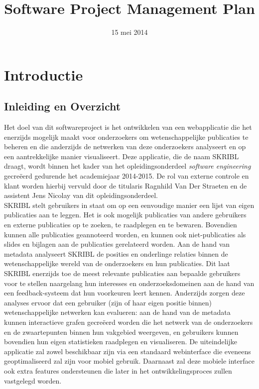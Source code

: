 \documentclass{article}
\title{Software Project Management Plan}
\author{} %
\date{15 mei 2014} %
\begin{document}




\tableofcontents
\newpage








\section{Introductie}

\subsection{Inleiding en Overzicht}
Het doel van dit softwareproject is het ontwikkelen van een webapplicatie die het enerzijds mogelijk maakt voor onderzoekers om wetenschappelijke publicaties te beheren en die anderzijds de netwerken van deze onderzoekers analyseert en op een aantrekkelijke manier visualiseert. Deze applicatie, die de naam SKRIBL draagt, wordt binnen het kader van het opleidingsonderdeel \emph{software engineering} gecre\"{e}erd gedurende het academiejaar 2014-2015. De rol van externe controle en klant worden hierbij vervuld door de titularis Ragnhild Van Der Straeten en de assistent Jens Nicolay van dit opleidingsonderdeel.\newline
\\
SKRIBL stelt gebruikers in staat om op een eenvoudige manier een lijst van eigen publicaties aan te leggen. Het is ook mogelijk publicaties van andere gebruikers en externe publicaties op te zoeken, te raadplegen en te bewaren. Bovendien kunnen alle publicaties geannoteerd worden, en kunnen ook niet-publicaties als slides en bijlagen aan de publicaties gerelateerd worden. Aan de hand van metadata analyseert SKRIBL de posities en onderlinge relaties binnen de wetenschappelijke wereld van de onderzoekers en hun publicaties. Dit laat SKRIBL enerzijds toe de meest relevante publicaties aan bepaalde gebruikers voor te stellen naargelang hun interesses en onderzoeksdomeinen aan de hand van een feedback-systeem dat hun voorkeuren leert kennen. Anderzijds zorgen deze analyses ervoor dat een gebruiker (zijn of haar eigen positie binnen) wetenschappelijke netwerken kan evalueren: aan de hand van de metadata kunnen interactieve grafen gecre\"{e}erd worden die het netwerk van de onderzoekers en de zwaartepunten binnen hun vakgebied weergeven, en gebruikers kunnen bovendien hun eigen statistieken raadplegen en visualiseren. De uiteindelijke applicatie zal zowel beschikbaar zijn via een standaard webinterface die eveneens geoptimaliseerd zal zijn voor mobiel gebruik. Daarnaast zal deze mobiele interface ook extra features ondersteunen die later in het ontwikkelingsproces zullen vastgelegd worden.\newline
\end{document}
